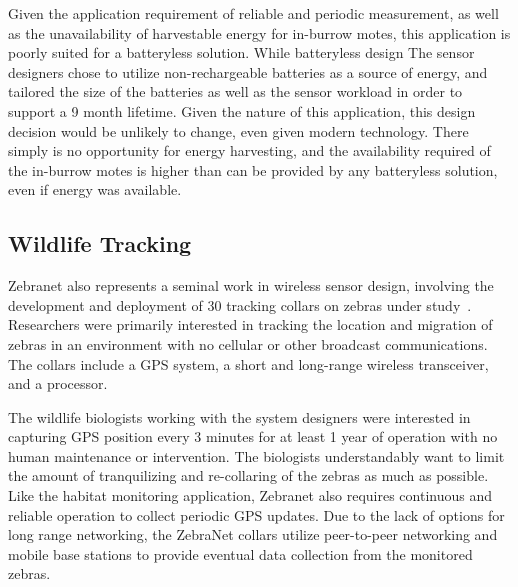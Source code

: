 Given the application requirement of reliable and periodic measurement, as well as the unavailability of harvestable energy for in-burrow motes, this application is poorly suited for a batteryless solution. 
While batteryless design The sensor designers chose to utilize non-rechargeable batteries as a source of energy, and tailored the size of the batteries as well as the sensor workload in order to support a 9 month lifetime. 
Given the nature of this application, this design decision would be unlikely to change, even given modern technology.
There simply is no opportunity for energy harvesting, and the availability required of the in-burrow motes is higher than can be provided by any batteryless solution, even if energy was available.

\subsection{Wildlife Tracking}
Zebranet also represents a seminal work in wireless sensor design, involving the development and deployment of 30 tracking collars on zebras under study~\cite{juang2002energy}. Researchers were primarily interested in tracking the location and migration of zebras in an environment with no cellular or other broadcast communications. The collars include a GPS system, a short and long-range wireless transceiver, and a processor.

The wildlife biologists working with the system designers were interested in capturing GPS position every 3 minutes for at least 1 year of operation with no human maintenance or intervention. The biologists understandably want to limit the amount of tranquilizing and re-collaring of the zebras as much as possible. Like the habitat monitoring application, Zebranet also requires continuous and reliable operation to collect periodic GPS updates. Due to the lack of options for long range networking, the ZebraNet collars utilize peer-to-peer networking and mobile base stations to provide eventual data collection from the monitored zebras. 

